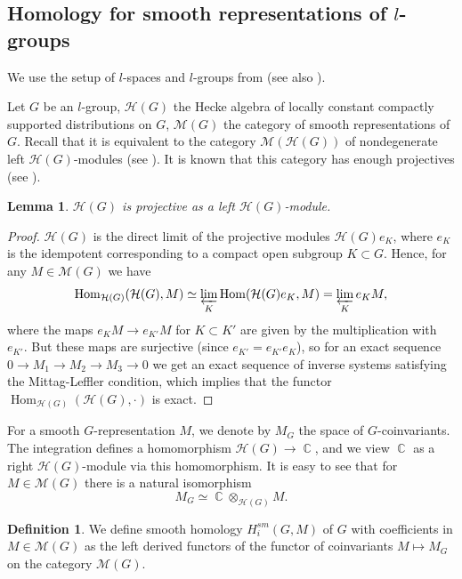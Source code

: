 \documentclass[12pt,reqno]{amsart}
\DeclareMathOperator\C{\mathbb C}
\newtheorem{lemma}[theorem]{Lemma}
\theoremstyle{definition}
\newtheorem{definition}[theorem]{Definition}
\theoremstyle{remark}
\numberwithin{equation}{section}
\newcommand{\ot}{\otimes}
\newcommand{\Hom}{\operatorname{Hom}}
\newcommand{\HH}{{\mathcal H}}
\newcommand{\MM}{{\mathcal M}}
\newcommand{\sub}{\subset}
\begin{document}
\subsection{Homology for smooth representations of $l$-groups}

We use the setup of $l$-spaces and $l$-groups from \cite{BZ} (see also \cite{Bern}).

Let $G$ be an $l$-group, $\HH(G)$ the Hecke algebra of locally constant compactly supported distributions on $G$,
$\MM(G)$ the category of smooth representations of $G$. Recall that it is equivalent to the category $\MM(\HH(G))$ of nondegenerate left $\HH(G)$-modules 
(see \cite[Sec.\ 2.1]{Bern}).
It is known that this category has enough projectives (see \cite[Sec.\ 2.2]{Bern}).

\begin{lemma}\label{Hecke-proj-lem}
$\HH(G)$ is projective as a left $\HH(G)$-module.
\end{lemma}

\begin{proof} $\HH(G)$ is the direct limit of the projective modules $\HH(G)e_K$, where $e_K$ is the idempotent corresponding to a compact open subgroup $K\sub G$.
Hence, for any $M\in \MM(G)$ we have
$$\Hom_{\HH(G)}(\HH(G),M)\simeq \varprojlim_K \Hom(\HH(G)e_K,M)=\varprojlim_K e_KM,$$
where the maps $e_KM\to e_{K'}M$ for $K\sub K'$ are given by the multiplication with $e_{K'}$. But these maps are surjective (since $e_{K'}=e_{K'}e_K$),
so for an exact sequence $0\to M_1\to M_2\to M_3\to 0$ we get an exact sequence of inverse systems satisfying the Mittag-Leffler condition, which implies
that the functor $\Hom_{\HH(G)}(\HH(G),\cdot)$ is exact.
\end{proof}

For a smooth $G$-representation $M$, we denote by $M_G$ the space of $G$-coinvariants.
The integration defines a homomorphism $\HH(G)\to \C$, and we view $\C$ as a right $\HH(G)$-module via this homomorphism.
It is easy to see that for $M\in \MM(G)$ there is a natural isomorphism
\begin{equation}\label{coinv-tensor-eq}
M_G\simeq \C\ot_{\HH(G)} M.
\end{equation}

\begin{definition}
We define smooth homology $H^{sm}_i(G,M)$ of $G$ with coefficients in $M\in \MM(G)$ as the left derived functors of the functor of coinvariants $M\mapsto M_G$
on the category $\MM(G)$.
\end{definition}
\end{document}
